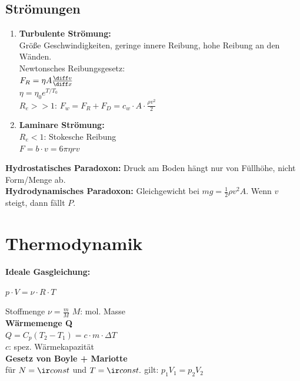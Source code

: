 \documentclass[german]{latex4ei/latex4ei_sheet}
\begin{document}
\subsection{Strömungen}
\begin{enumerate}
	\item \textbf{Turbulente Strömung:} \\
		Größe Geschwindigkeiten, geringe innere Reibung, hohe Reibung an den Wänden.\\
			Newtonsches Reibungsgesetz:\\
			$F_R=\eta A \frac{\diff v}{\diff x}$\\
			$\eta=\eta_0e^{T/T_0}$ \\
			$R_e >> 1$: $F_w=F_R+F_D=c_w \cdot A \cdot \frac{\rho v^2}{2}$
	\item \textbf{Laminare Strömung:} \\
			$R_e<1$: Stokesche Reibung\\
			$F=b\cdot v = 6\pi \eta r v$
\end{enumerate}
\textbf{Hydrostatisches Paradoxon:} Druck am Boden hängt nur von Füllhöhe, nicht Form/Menge ab.\\
\textbf{Hydrodynamisches Paradoxon:} Gleichgewicht bei $mg=\frac{1}{2}\rho v^2 A$. Wenn $v$ steigt, dann fällt $P$.


\section{Thermodynamik}

\textbf{Ideale Gasgleichung:} 
\begin{emphbox}
$p \cdot V = \nu \cdot R \cdot T$ 
\end{emphbox}
Stoffmenge $\nu = \frac{m}{M}$ \qquad $M$: mol. Masse\\
\textbf{Wärmemenge Q} \\
$Q=C_p(T_2-T_1)=c \cdot m \cdot \Delta T$ \\ $c$: spez. Wärmekapazität \\

\textbf{Gesetz von Boyle + Mariotte} \\
für $N=\ir const$ und $T=\ir const.$ gilt: $p_1V_1=p_2V_2$ \\
\end{document}
